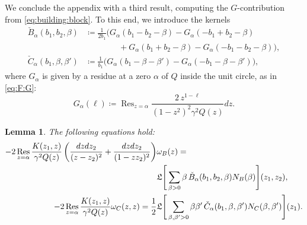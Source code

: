 \documentclass[a4paper,11pt,english]{article}
\theoremstyle{plain}
\newtheorem{lemma}[theorem]{Lemma}
\theoremstyle{definition}
\theoremstyle{plain}
\DeclareMathOperator*{\Res}{Res}
\begin{document}
We conclude the appendix with a third result, computing the $G$-contribution from \cref{eq:building:block}. To this end, we introduce the kernels
\begin{equation}
\begin{split}
	\check{B}_{\alpha}(b_1,b_2,\beta)
	&\coloneqq
	\frac{1}{2b_1}
	\bigl(
		G_{\alpha}(b_1 - b_2 - \beta) - G_{\alpha}(-b_1 + b_2 - \beta) \\
		&\qquad\qquad
		+ G_{\alpha}(b_1 + b_2 - \beta) - G_{\alpha}(-b_1 - b_2 - \beta)
	\bigr), \\
	\check{C}_{\alpha}(b_1,\beta,\beta')
	&\coloneqq
	\frac{1}{b_1}
	\bigl(
		G_{\alpha}(b_1 - \beta - \beta') - G_{\alpha}(-b_1 - \beta - \beta')
	\bigr),
\end{split}
\end{equation}
where $G_{\alpha}$ is given by a residue at a zero $\alpha$ of $Q$ inside the unit circle, as in \cref{eq:F:G}:
\begin{equation}
	G_{\alpha}(\ell)
	\coloneqq
	\Res_{z = \alpha} \frac{2 \, z^{1-\ell}}{(1-z^2)^2 \gamma^2 Q(z)} dz .
\end{equation}

\begin{lemma}\label{lem:zeros}
	The following equations hold:
	\begin{align}
		\notag
		\label{eq:Balpha}
		- 2\Res_{z = \alpha}
			\frac{K(z_1,z)}{\gamma^2 Q(z)}
			\left( \frac{dz dz_2}{(z-z_2)^2} + \frac{dz dz_2}{(1-z z_2)^2} \right)
			& \omega_B(z)
		= \\
		& \mathfrak{L}\Bigg[
			\sum_{\beta > 0} \beta \, \check{B}_{\alpha}(b_1,b_2,\beta) N_B(\beta) 
		\Bigg](z_1,z_2),
		\\
		\label{eq:Calpha}
		- 2\Res_{z = \alpha}
			\frac{K(z_1,z)}{\gamma^2 Q(z)} \omega_C(z,z)
		=
		\frac{1}{2}
		&
		\mathfrak{L}\Bigg[
			\sum_{\beta,\beta' > 0} \beta \beta' \, \check{C}_{\alpha}(b_1,\beta,\beta') N_C(\beta,\beta') 
		\Bigg](z_1).
	\end{align}
\end{lemma}
\end{document}
